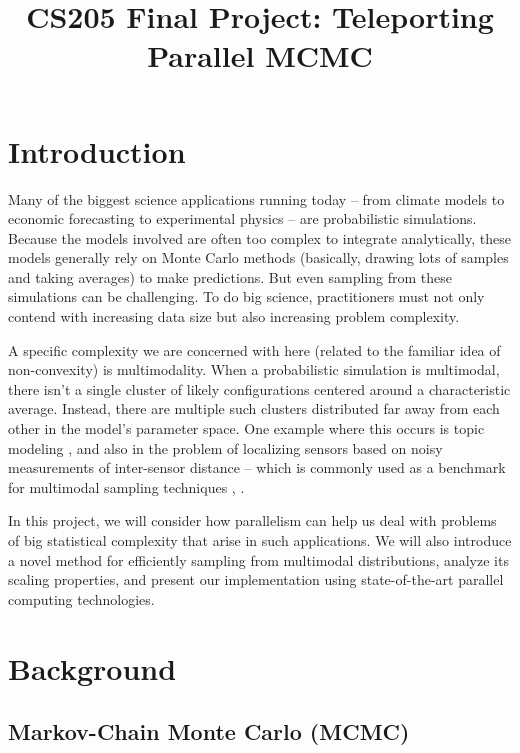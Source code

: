 \documentclass{article}
\title{CS205 Final Project: Teleporting Parallel MCMC}
\begin{document}
\maketitle

\section{Introduction}

Many of the biggest science applications running today -- from climate models
\cite{climate} to economic forecasting \cite{forecast} to experimental physics
\cite{physics} -- are probabilistic simulations. Because the models involved
are often too complex to integrate analytically, these models generally rely on
Monte Carlo methods (basically, drawing lots of samples and taking averages) to
make predictions. But even sampling from these simulations can be challenging.
To do big science, practitioners must not only contend with increasing data
size but also increasing problem complexity.

A specific complexity we are concerned with here (related to the familiar idea
of non-convexity) is multimodality. When a probabilistic simulation is
multimodal, there isn't a single cluster of likely configurations centered
around a characteristic average. Instead, there are multiple such clusters
distributed far away from each other in the model's parameter space. One
example where this occurs is topic modeling \cite{topicmodes}, and also in the
problem of localizing sensors based on noisy measurements of inter-sensor
distance -- which is commonly used as a benchmark for multimodal sampling
techniques \cite{wormhole}, \cite{darting}.

In this project, we will consider how parallelism can help us deal with
problems of big statistical complexity that arise in such applications. We will
also introduce a novel method for efficiently sampling from multimodal
distributions, analyze its scaling properties, and present our implementation
using state-of-the-art parallel computing technologies.

\section{Background}

\subsection{Markov-Chain Monte Carlo (MCMC)}
\end{document}
